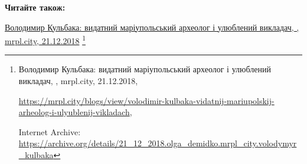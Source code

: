  
 
 
 
 

\def\pubIA{https://archive.org/details/21_12_2018.olga_demidko.mrpl_city.volodymyr_kulbaka}
\def\pubTitle{Володимир Кульбака: видатний маріупольський археолог і улюблений викладач}
\def\pubDate{21.12.2018}
\def\pubOrigin{https://mrpl.city/blogs/view/volodimir-kulbaka-vidatnij-mariupolskij-arheolog-i-ulyublenij-vikladach}
\def\pubAuthor{\pubAuthorDemidko}

\textbf{Читайте також:}\par\href{\pubIA}{%
\pubTitle, \pubAuthor, mrpl.city, \pubDate}%
\footnote{\pubTitle, \pubAuthor, mrpl.city, \pubDate, \par\url{\pubOrigin}, \par Internet Archive: \url{\pubIA}}
